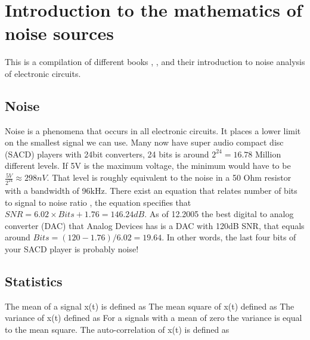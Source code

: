 
\chapter{Introduction to the mathematics of noise sources}
\label{ap:noise}

This is a compilation of different books \cite{ziel}, \cite{johns},
\cite{razavi} and
their introduction to noise analysis of electronic circuits.


\section{Noise}
Noise is a phenomena that occurs in all electronic circuits. It
places a lower limit on the smallest signal we can use. Many now have super audio compact disc (SACD)
players with 24bit
converters, 24 bits is around $2^{24} = 16.78$ Million different
levels. If 5V is the maximum voltage, the minimum would have to be
$\frac{5V}{2^{24}} \approx 298nV$. That level is roughly equivalent to the noise in a 50
Ohm resistor with a bandwidth of 96kHz. There exist an equation that relates number of bits to
signal to noise ratio \cite{johns}, the equation specifies that $SNR =
6.02 \times Bits +
1.76 = 146.24dB$. As of 12.2005 the best digital to analog converter (DAC)
that Analog Devices  has is a DAC
with 120dB SNR, that equals around $Bits = (120-1.76)/6.02 =
19.64$. In other words, the last four bits of your SACD player is probably
noise!

\section{Statistics}

The mean of a signal x(t) is defined as
The mean square of x(t) defined as 
The variance of x(t) defined as
For a signals with a mean of zero the variance is equal to the mean
square.
The auto-correlation of x(t) is defined as

